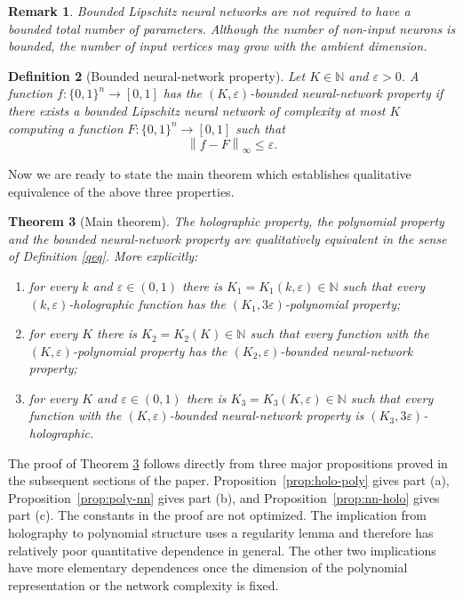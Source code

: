 \documentclass[11pt]{amsart}
\newtheorem{theorem}{Theorem}[section]
\newtheorem{definition}[theorem]{Definition}
\newtheorem{remark}[theorem]{Remark}
\newcommand{\N}{\mathbb N}
\newcommand{\1}{\mathbf 1}
\newcommand{\cube}{\{0,1\}}
\newcommand{\norm}[1]{\left\lVert #1\right\rVert}
\begin{document}
\begin{remark}
Bounded Lipschitz neural networks are not required to have a bounded total
number of parameters.  Although the number of non-input neurons is bounded, the
number of input vertices may grow with the ambient dimension.
\end{remark}

\begin{definition}[Bounded neural-network property]
Let $K\in\N$ and $\varepsilon>0$.  A function $f:\cube^n\to[0,1]$ has the \emph{$(K,\varepsilon)$-bounded neural-network property} if there exists a bounded Lipschitz neural network of complexity at most $K$ computing a function $F:\cube^n\to[0,1]$ such that
\[
        \norm{f-F}_{\infty}\leq\varepsilon .
\]
\end{definition}

Now we are ready to state the main theorem which establishes qualitative equivalence of the above three properties.

\begin{theorem}[Main theorem]\label{thm:main}
The holographic property, the polynomial property and the bounded neural-network property are qualitatively equivalent in the sense of Definition \ref{qeq}.
More explicitly:
\begin{enumerate}[label=\textup{(\alph*)}]
    \item for every $k$ and $\varepsilon\in(0,1)$ there is $K_1=K_1(k,\varepsilon)\in\N$ such that every $(k,\varepsilon)$-holographic function has the $(K_1,3\varepsilon)$-polynomial property;
    \item for every $K$ there is $K_2=K_2(K)\in\N$ such that every function with the $(K,\varepsilon)$-polynomial property has the $(K_2,\varepsilon)$-bounded neural-network property;
    \item for every $K$ and $\varepsilon\in(0,1)$ there is $K_3=K_3(K,\varepsilon)\in\N$ such that every function with the $(K,\varepsilon)$-bounded neural-network property is $(K_3,3\varepsilon)$-holographic.
\end{enumerate}
\end{theorem}

The proof of Theorem \ref{thm:main} follows directly from three major propositions proved in
the subsequent sections of the paper. Proposition~\ref{prop:holo-poly} gives part \textup{(a)},
Proposition~\ref{prop:poly-nn} gives part \textup{(b)}, and
Proposition~\ref{prop:nn-holo} gives part \textup{(c)}.  
The constants in the proof are not optimized.  The implication from holography to polynomial structure uses a regularity lemma and therefore has relatively poor quantitative dependence in general.  The other two implications have more elementary dependences once the dimension of the polynomial representation or the network complexity is fixed.  
\end{document}
